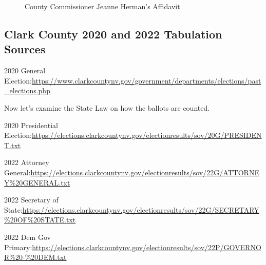 \documentclass[preprint,13pt]{elsarticle}
\begin{document}
\begin{figure}[bp!]
\caption{County Commissioner Jeanne Herman's Affidavit}
    \centering
\end{figure}

\newpage
\subsection{Clark County 2020 and 2022 Tabulation Sources}
2020 General Election:\url{https://www.clarkcountynv.gov/government/departments/elections/past_elections.php}

Now let's examine the State Law on how the ballots are counted.

2020 Presidential Election:\url{https://elections.clarkcountynv.gov/electionresults/sov/20G/PRESIDENT.txt}

2022 Attorney General:\url{https://elections.clarkcountynv.gov/electionresults/sov/22G/ATTORNEY%20GENERAL.txt}

2022 Secretary of State:\url{https://elections.clarkcountynv.gov/electionresults/sov/22G/SECRETARY%20OF%20STATE.txt}

2022 Dem Gov Primary:\url{https://elections.clarkcountynv.gov/electionresults/sov/22P/GOVERNOR%20-%20DEM.txt}
\end{document}
